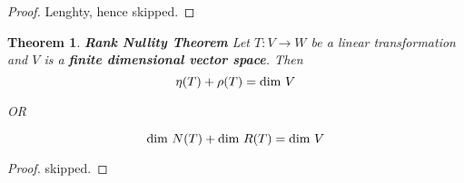 \documentclass[a4paper, titlepage]{article}
\newtheorem{theorem}{Theorem}[section]
\begin{document}
        \begin{proof}
            Lenghty, hence skipped.
        \end{proof}
        \begin{theorem} \textup{\textbf{Rank Nullity Theorem}}
            Let $T: V \rightarrow W$ be a linear transformation and $V$
            is a \textbf{finite dimensional vector space}. Then 
            \[ \eta(T) + \rho(T) = \textup{dim }V \]
            \begin{center}
                OR
            \end{center}
            \[ \textup{dim }N(T) + \textup{dim }R(T) = \textup{dim }V \]
        \end{theorem}
        \begin{proof}
            skipped.
        \end{proof}

        \setlength{\fboxsep}{1em}
        \noindent{}
\end{document}
